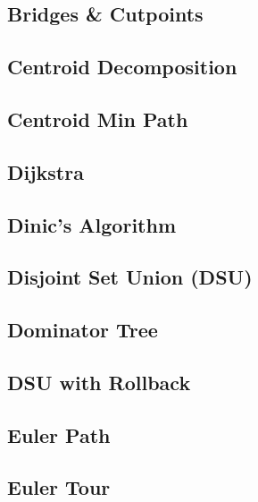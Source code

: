 \subsection{Bridges & Cutpoints}
\raggedbottom
\hrulefill
\subsection{Centroid Decomposition}
\raggedbottom
\hrulefill
\subsection{Centroid Min Path}
\raggedbottom
\hrulefill
\subsection{Dijkstra}
\raggedbottom
\hrulefill
\subsection{Dinic's Algorithm}
\raggedbottom
\hrulefill
\subsection{Disjoint Set Union (DSU)}
\raggedbottom
\hrulefill
\subsection{Dominator Tree}
\raggedbottom
\hrulefill
\subsection{DSU with Rollback}
\raggedbottom
\hrulefill
\subsection{Euler Path}
\raggedbottom
\hrulefill
\subsection{Euler Tour}
\raggedbottom
\hrulefill
